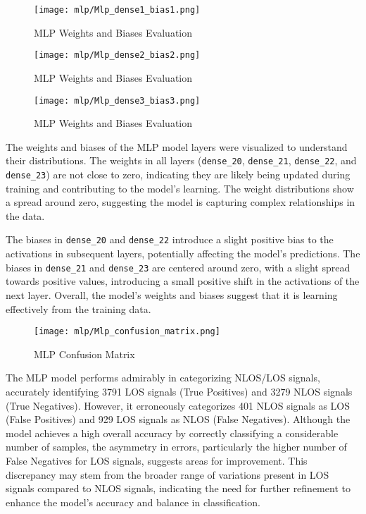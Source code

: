 \begin{figure}[H] 
  \centering
  \texttt{[image: mlp/Mlp\_dense1\_bias1.png]}
  \caption{MLP Weights and Biases Evaluation}\label{fig:dense1_bias1}
\end{figure}

\begin{figure}[H] 
  \centering
  \texttt{[image: mlp/Mlp\_dense2\_bias2.png]}
  \caption{MLP Weights and Biases Evaluation}\label{fig:dense2_bias2}
\end{figure}

\begin{figure}[H] 
  \centering
  \texttt{[image: mlp/Mlp\_dense3\_bias3.png]}
  \caption{MLP Weights and Biases Evaluation}\label{fig:dense3_bias3}
\end{figure}

The weights and biases of the MLP model layers were visualized to understand their distributions. The weights in all layers (\texttt{dense\_20}, \texttt{dense\_21}, \texttt{dense\_22}, and \texttt{dense\_23}) are not close to zero, indicating they are likely being updated during training and contributing to the model’s learning. The weight distributions show a spread around zero, suggesting the model is capturing complex relationships in the data.

The biases in \texttt{dense\_20} and \texttt{dense\_22} introduce a slight positive bias to the activations in subsequent layers, potentially affecting the model’s predictions. The biases in \texttt{dense\_21} and \texttt{dense\_23} are centered around zero, with a slight spread towards positive values, introducing a small positive shift in the activations of the next layer. Overall, the model’s weights and biases suggest that it is learning effectively from the training data.


\begin{figure}[H] 
  \centering
  \texttt{[image: mlp/Mlp\_confusion\_matrix.png]}
  \caption{MLP Confusion Matrix}\label{fig:mpl_confusion_matrix}
\end{figure}

The MLP model performs admirably in categorizing NLOS/LOS signals, accurately identifying 3791 LOS signals (True Positives) and 3279 NLOS signals (True Negatives). However, it erroneously categorizes 401 NLOS signals as LOS (False Positives) and 929 LOS signals as NLOS (False Negatives). Although the model achieves a high overall accuracy by correctly classifying a considerable number of samples, the asymmetry in errors, particularly the higher number of False Negatives for LOS signals, suggests areas for improvement. This discrepancy may stem from the broader range of variations present in LOS signals compared to NLOS signals, indicating the need for further refinement to enhance the model's accuracy and balance in classification.

